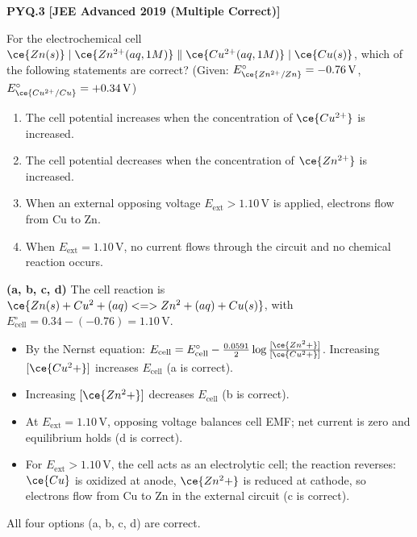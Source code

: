 \begin{problembox}
\textbf{PYQ.3} \hfill \textbf{[JEE Advanced 2019 (Multiple Correct)]}

For the electrochemical cell $\ce{Zn(s)} \mid \ce{Zn^{2+}(aq, 1 M)} \parallel \ce{Cu^{2+}(aq, 1 M)} \mid \ce{Cu(s)}$, which of the following statements are correct? (Given: $E^\circ_{\ce{Zn^{2+}/Zn}} = -0.76\,\text{V}$, $E^\circ_{\ce{Cu^{2+}/Cu}} = +0.34\,\text{V}$)
\begin{enumerate}[label=(\alph*)]
    \item The cell potential increases when the concentration of $\ce{Cu^{2+}}$ is increased.
    \item The cell potential decreases when the concentration of $\ce{Zn^{2+}}$ is increased.
    \item When an external opposing voltage $E_{\text{ext}} > 1.10\,\text{V}$ is applied, electrons flow from Cu to Zn.
    \item When $E_{\text{ext}} = 1.10\,\text{V}$, no current flows through the circuit and no chemical reaction occurs.
\end{enumerate}
\end{problembox}
\begin{solution}
\textbf{(a, b, c, d)}
The cell reaction is $\ce{Zn(s) + Cu^2+(aq) <=> Zn^2+(aq) + Cu(s)}$, with $E^\circ_{\text{cell}} = 0.34 - (-0.76) = 1.10\,\text{V}$.
\begin{itemize}
    \item By the Nernst equation: $E_{\text{cell}} = E^\circ_{\text{cell}} - \frac{0.0591}{2}\log \frac{[\ce{Zn^2+}]}{[\ce{Cu^2+}]}$. Increasing $[\ce{Cu^2+}]$ increases $E_{\text{cell}}$ (a is correct).
    \item Increasing $[\ce{Zn^2+}]$ decreases $E_{\text{cell}}$ (b is correct).
    \item At $E_{\text{ext}} = 1.10\,\text{V}$, opposing voltage balances cell EMF; net current is zero and equilibrium holds (d is correct).
    \item For $E_{\text{ext}} > 1.10\,\text{V}$, the cell acts as an electrolytic cell; the reaction reverses: $\ce{Cu}$ is oxidized at anode, $\ce{Zn^2+}$ is reduced at cathode, so electrons flow from Cu to Zn in the external circuit (c is correct).
\end{itemize}
All four options (a, b, c, d) are correct.
\end{solution}


